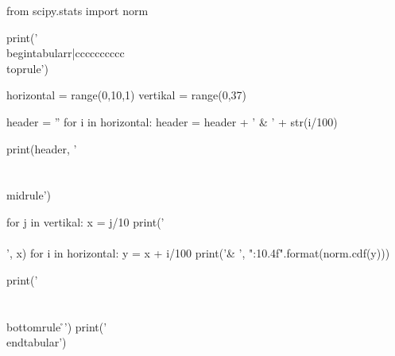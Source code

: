 \documentclass[12pt]{scrartcl}
\begin{document}
\begin{pycode}
from scipy.stats import norm

print('\\begin{tabular}{r|cccccccccc} \\toprule')

horizontal = range(0,10,1)
vertikal = range(0,37)
 
header = ''
for i in horizontal:
    header = header + ' & ' + str(i/100)
 
print(header, '\\\\ \\midrule')
 
for j in vertikal:  
    x = j/10
    print('\\\\', x)
    for i in horizontal:
        y = x + i/100
        print('& ', "{:10.4f}".format(norm.cdf(y)))
 
print('\\\\ \\bottomrule \r\n')
print('\\end{tabular}')
\end{pycode}

	
\end{document}
